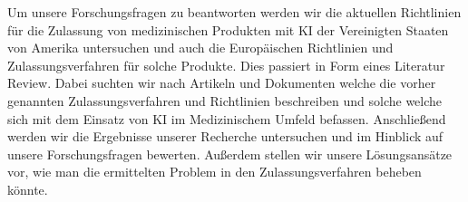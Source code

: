 Um unsere Forschungsfragen zu beantworten werden wir die aktuellen Richtlinien für die Zulassung von medizinischen Produkten mit KI der Vereinigten Staaten von Amerika untersuchen und auch die Europäischen Richtlinien und Zulassungsverfahren für solche Produkte. Dies passiert in Form eines Literatur Review. Dabei suchten wir nach Artikeln und Dokumenten welche die vorher genannten Zulassungsverfahren und Richtlinien beschreiben und solche welche sich mit dem Einsatz von KI im Medizinischem Umfeld befassen. Anschließend werden wir die Ergebnisse unserer Recherche untersuchen und im Hinblick auf unsere Forschungsfragen bewerten. Außerdem stellen wir unsere Lösungsansätze vor, wie man die ermittelten Problem in den Zulassungsverfahren beheben könnte.